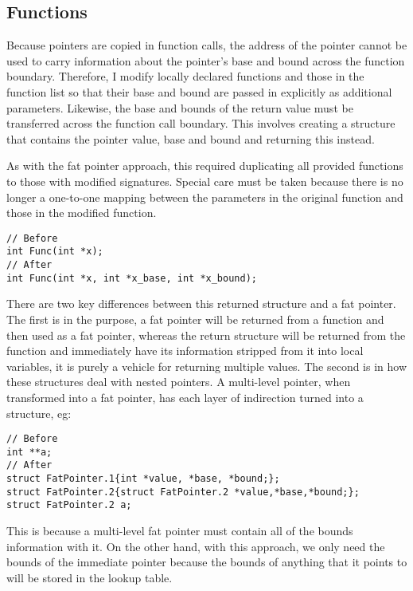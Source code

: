 \subsection{Functions}

Because pointers are copied in function calls, the address of the pointer cannot be used to carry information about the pointer's base and bound across the function boundary.
Therefore, I modify locally declared functions and those in the function list so that their base and bound are passed in explicitly as additional parameters.
Likewise, the base and bounds of the return value must be transferred across the function call boundary.
This involves creating a structure that contains the pointer value, base and bound and returning this instead.

As with the fat pointer approach, this required duplicating all provided functions to those with modified signatures.
Special care must be taken because there is no longer a one-to-one mapping between the parameters in the original function and those in the modified function.

\begin{verbatim}
// Before
int Func(int *x);
// After
int Func(int *x, int *x_base, int *x_bound);
\end{verbatim}

There are two key differences between this returned structure and a fat pointer.
The first is in the purpose, a fat pointer will be returned from a function and then used as a fat pointer, whereas the return structure will be returned from the function and immediately have its information stripped from it into local variables, it is purely a vehicle for returning multiple values.
The second is in how these structures deal with nested pointers.
A multi-level pointer, when transformed into a fat pointer, has each layer of indirection turned into a structure, eg:

\begin{verbatim}
// Before
int **a;
// After
struct FatPointer.1{int *value, *base, *bound;};
struct FatPointer.2{struct FatPointer.2 *value,*base,*bound;};
struct FatPointer.2 a;
\end{verbatim}

This is because a multi-level fat pointer must contain all of the bounds information with it.
On the other hand, with this approach, we only need the bounds of the immediate pointer because the bounds of anything that it points to will be stored in the lookup table.

